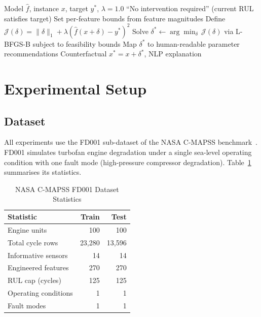 \documentclass[10pt, journal, letterpaper]{IEEEtran}
\begin{document}
\begin{algorithm}[H]
\caption{Counterfactual Generation}
\begin{algorithmic}[1]
\REQUIRE Model $\hat{f}$, instance $x$, target $y^*$, $\lambda=1.0$
  \RETURN ``No intervention required'' (current RUL satisfies target)
\ENDIF
\STATE Set per-feature bounds from feature magnitudes
\STATE Define $\mathcal{J}(\delta) = \|\delta\|_1 + \lambda(\hat{f}(x+\delta)-y^*)^2$
\STATE Solve $\delta^* \leftarrow \arg\min_\delta\,\mathcal{J}(\delta)$
       via L-BFGS-B subject to feasibility bounds
\STATE Map $\delta^*$ to human-readable parameter recommendations
\RETURN Counterfactual $x^* = x+\delta^*$, NLP explanation
\end{algorithmic}
\end{algorithm}

\section{Experimental Setup}
\label{sec:setup}

\subsection{Dataset}

All experiments use the FD001 sub-dataset of the NASA C-MAPSS
benchmark~\cite{cmapss}. FD001 simulates turbofan engine degradation under
a single sea-level operating condition with one fault mode (high-pressure
compressor degradation). Table~\ref{tab:dataset} summarises its statistics.

\begin{table}[htbp]
\caption{NASA C-MAPSS FD001 Dataset Statistics}
\label{tab:dataset}
\centering\small
\begin{tabular}{lrr}
\toprule
\textbf{Statistic} & \textbf{Train} & \textbf{Test} \\
\midrule
Engine units          & 100     & 100     \\
Total cycle rows      & 23,280  & 13,596  \\
Informative sensors   & 14      & 14      \\
Engineered features   & 270     & 270     \\
RUL cap (cycles)      & 125     & 125     \\
Operating conditions  & 1       & 1       \\
Fault modes           & 1       & 1       \\
\bottomrule
\end{tabular}
\end{table}
\end{document}
